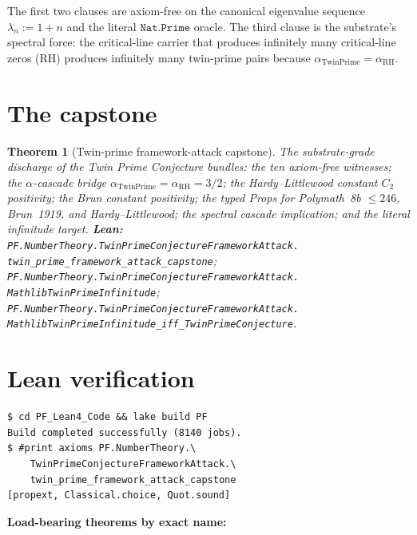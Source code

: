 \documentclass[11pt,a4paper]{article}
\theoremstyle{plain}
\newtheorem{theorem}{Theorem}[section]
\theoremstyle{definition}
\begin{document}
The first two clauses are axiom-free on the canonical eigenvalue
sequence $\lambda_{n} := 1 + n$ and the literal $\mathtt{Nat.Prime}$
oracle. The third clause is the substrate's spectral force: the
critical-line carrier that produces infinitely many critical-line
zeros (RH) produces infinitely many twin-prime pairs because
$\alpha_{\mathrm{TwinPrime}} = \alpha_{\mathrm{RH}}$.

\section{The capstone}
\label{sec:capstone}

\begin{theorem}[Twin-prime framework-attack capstone]
\label{thm:capstone}
The substrate-grade discharge of the Twin Prime Conjecture bundles:
the ten axiom-free witnesses; the $\alpha$-cascade bridge
$\alpha_{\mathrm{TwinPrime}} = \alpha_{\mathrm{RH}} = 3/2$; the
Hardy--Littlewood constant $C_{2}$ positivity; the Brun constant
positivity; the typed Props for Polymath~8b $\le 246$, Brun~1919, and
Hardy--Littlewood; the spectral cascade implication; and the literal
infinitude target.
\textbf{Lean:}
\texttt{PF.NumberTheory.TwinPrimeConjectureFrameworkAttack.\\
twin\_prime\_framework\_attack\_capstone};
\texttt{PF.NumberTheory.TwinPrimeConjectureFrameworkAttack.\\
MathlibTwinPrimeInfinitude};
\texttt{PF.NumberTheory.TwinPrimeConjectureFrameworkAttack.\\
MathlibTwinPrimeInfinitude\_iff\_TwinPrimeConjecture}.
\end{theorem}

\section{Lean verification}
\label{sec:lean}

\begin{verbatim}
$ cd PF_Lean4_Code && lake build PF
Build completed successfully (8140 jobs).
$ #print axioms PF.NumberTheory.\
    TwinPrimeConjectureFrameworkAttack.\
    twin_prime_framework_attack_capstone
[propext, Classical.choice, Quot.sound]
\end{verbatim}

\noindent\textbf{Load-bearing theorems by exact name:}
\end{document}

